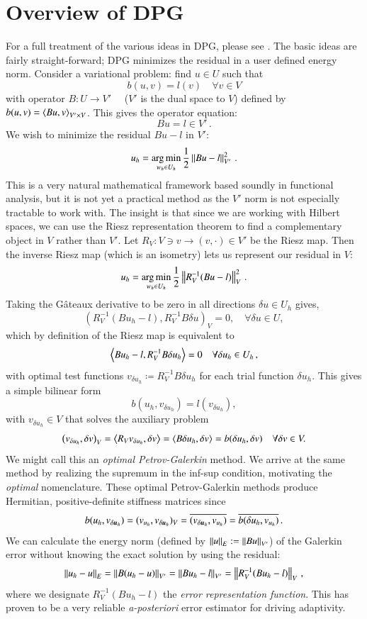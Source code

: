 \documentclass[preprint,12pt]{elsarticle}
\begin{document}
\section{Overview of DPG}
For a full treatment of the various ideas in DPG, please see \cite{DPGOverview}.
The basic ideas are fairly straight-forward; DPG minimizes the residual in a user defined energy norm.
Consider a variational problem: find $u\in U$ such that
\[
b(u,v)=l(v) \quad\forall v\in V
\]
with operator $B:U\rightarrow V'\quad$ ($V'$ is the dual space to $V$) defined by $b(u,v)=\left\langle Bu,v \right\rangle_{V'\times V}$.
This gives the operator equation:
\[
Bu=l\in V'\,.
\]
We wish to minimize the residual $Bu-l$ in $V'$:
\[
u_h=\operatorname*{arg\,min}_{w_h\in U_h}\frac{1}{2}\left\| Bu-l \right\|^2_{V'}\,.
\]
This is a very natural mathematical framework based soundly in functional analysis, but it is not yet a practical method as the $V'$ norm is not
especially tractable to work with.
The insight is that since we are working with Hilbert spaces, we can use the Riesz representation theorem to find a complementary object 
in $V$ rather than $V'$. Let $R_V:V\ni v\rightarrow(v,\cdot)\in V'$ be the Riesz map. 
Then the inverse Riesz map (which is an isometry) lets us represent our residual in $V$:
\[
u_h=\operatorname*{arg\,min}_{w_h\in U_h}\frac{1}{2}\left\| R_V^{-1}(Bu-l) \right\|^2_{V}\,.
\]
Taking the G\^ateaux derivative to be zero in all directions $\delta u \in
U_h$ gives,
\[
\left(R_V^{-1}(Bu_h-l),R_V^{-1}B\delta u\right)_V = 0, \quad \forall \delta u \in U,
\]
which by definition of the Riesz map is equivalent to 
\begin{equation*}
\left\langle Bu_h-l,R_V^{-1}B\delta u_h \right\rangle=0\quad\forall\delta u_h\in U_h\,,
\end{equation*}
with optimal test functions $v_{\delta u_h}\coloneqq R_V^{-1}B\delta u_h$ for each trial function $\delta u_h$.
This gives a simple bilinear form
\begin{equation*}
b(u_h,v_{\delta u_h})=l(v_{\delta u_h}),
\end{equation*}
with $v_{\delta u_h}\in V$ that solves the auxiliary problem
\begin{equation*}
\left( v_{\delta u_h},\delta v \right)_V=\left\langle R_Vv_{\delta u_h},\delta v \right\rangle
=\left\langle B\delta u_h,\delta v \right\rangle=b(\delta u_h,\delta v)\quad\forall\delta v\in V.
\end{equation*}
We might call this an \emph{optimal Petrov-Galerkin} method.
We arrive at the same method by realizing the supremum in the inf-sup condition, motivating the \emph{optimal} nomenclature.
These optimal Petrov-Galerkin methods produce Hermitian, positive-definite stiffness matrices since
\[
b(u_h,v_{\delta\boldsymbol{u}_h})=(v_{u_h},v_{\delta\boldsymbol{u}_h})_V=\overline{(v_{\delta\boldsymbol{u}_h},v_{u_h})}=\overline{b(\delta u_h,v_{u_h})}\,.
\]
We can calculate the energy norm (defined by $\left\| u \right\|_E:=\left\| Bu \right\|_{V'}$) of the Galerkin error without knowing the exact solution by using the residual:
\[
\left\| u_h-u \right\|_E=\left\| B(u_h-u) \right\|_{V'}=\left\| Bu_h-l \right\|_{V'}=\left\| R_V^{-1}(Bu_h-l) \right\|_V\,,
\]
where we designate $R_V^{-1}(Bu_h-l)$ the \emph{error representation function}.
This has proven to be a very reliable \emph{a-posteriori} error estimator for driving adaptivity.
\end{document}
